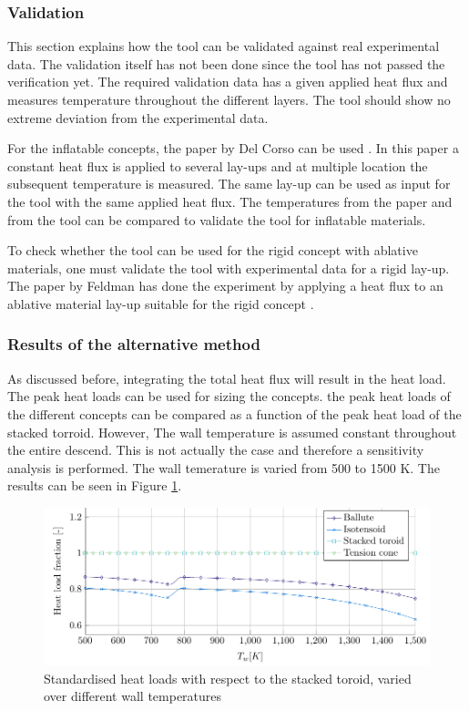 \subsubsection{Validation}
This section explains how the tool can be validated against real experimental data. The validation itself has not been done since the tool has not passed the verification yet. The required validation data has a given applied heat flux and measures temperature throughout the different layers. The tool should show no extreme deviation from the experimental data. 

For the inflatable concepts, the paper by Del Corso can be used \cite{Corso2009}. In this paper a constant heat flux is applied to several lay-ups and at multiple location the subsequent temperature is measured. The same lay-up can be used as input for the tool with the same applied heat flux. The temperatures from the paper and from the tool can be compared to validate the tool for inflatable materials. 

To check whether the tool can be used for the rigid concept with ablative materials, one must validate the tool with experimental data for a rigid lay-up. The paper by Feldman has done the experiment by applying a heat flux to an ablative material lay-up suitable for the rigid concept \cite{Feldman2012}.


\subsubsection{Results of the alternative method}
As discussed before, integrating the total heat flux will result in the heat load. The peak heat loads can be used for sizing the concepts. the peak heat loads of the different concepts can be compared as a function of the peak heat load of the stacked torroid. However, The wall temperature is assumed constant throughout the entire descend. This is not actually the case and therefore a sensitivity analysis is performed. The wall temerature is varied from 500 to 1500 K. The results can be seen in Figure \ref{fig:heatload}.

\begin{figure}[H]
	\centering
	\includegraphics{Figure/heatload.pdf}
	\caption{Standardised heat loads with respect to the stacked toroid, varied over different wall temperatures}
	\label{fig:heatload}
\end{figure}

